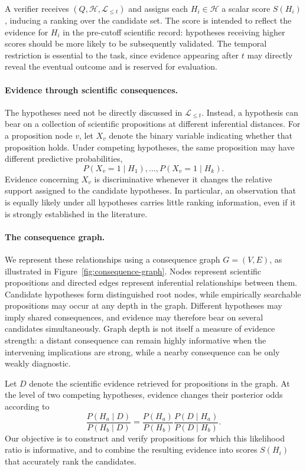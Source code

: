 \documentclass[twoside]{article}
\begin{document}
A verifier receives $(Q,\mathcal{H},\mathcal{L}_{\leq t})$ and assigns each
$H_i\in\mathcal{H}$ a scalar score $S(H_i)$, inducing a ranking over the
candidate set. The score is intended to reflect the evidence for $H_i$ in the
pre-cutoff scientific record: hypotheses receiving higher scores should be more
likely to be subsequently validated. The temporal restriction is essential to
the task, since evidence appearing after $t$ may directly reveal the eventual
outcome and is reserved for evaluation.

\paragraph{Evidence through scientific consequences.}
The hypotheses need not be directly discussed in $\mathcal{L}_{\leq t}$.
Instead, a hypothesis can bear on a collection of scientific propositions at
different inferential distances. For a proposition node $v$, let $X_v$ denote
the binary variable indicating whether that proposition holds. Under competing
hypotheses, the same proposition may have different predictive probabilities,
\begin{equation}
    P(X_v=1\mid H_1),\ldots,P(X_v=1\mid H_k).
\end{equation}
Evidence concerning $X_v$ is discriminative whenever it changes the relative
support assigned to the candidate hypotheses. In particular, an observation
that is equally likely under all hypotheses carries little ranking information,
even if it is strongly established in the literature.

\paragraph{The consequence graph.}
We represent these relationships using a consequence graph $G=(V,E)$, as
illustrated in Figure~\ref{fig:consequence-graph}. Nodes represent scientific
propositions and directed edges represent inferential relationships between
them. Candidate hypotheses form distinguished root nodes, while empirically
searchable propositions may occur at any depth in the graph. Different
hypotheses may imply shared consequences, and evidence may therefore bear on
several candidates simultaneously. Graph depth is not itself a measure of
evidence strength: a distant consequence can remain highly informative when
the intervening implications are strong, while a nearby consequence can be only
weakly diagnostic.

Let $D$ denote the scientific evidence retrieved for propositions in the graph.
At the level of two competing hypotheses, evidence changes their posterior odds
according to
\begin{equation}
\frac{P(H_a\mid D)}{P(H_b\mid D)}
=
\frac{P(H_a)}{P(H_b)}
\frac{P(D\mid H_a)}{P(D\mid H_b)}.
\end{equation}
Our objective is to construct and verify propositions for which this likelihood
ratio is informative, and to combine the resulting evidence into scores
$S(H_i)$ that accurately rank the candidates.
\end{document}

